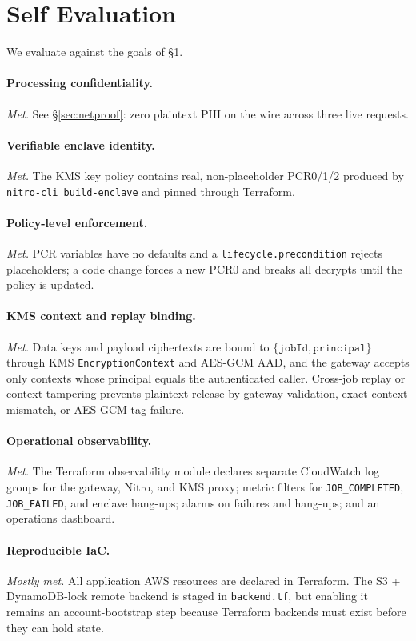 \documentclass[11pt]{article}
\begin{document}
\section{Self Evaluation}

We evaluate against the goals of \S1.

\paragraph{Processing confidentiality.} \emph{Met.} See
\S\ref{sec:netproof}: zero plaintext PHI on the wire across three
live requests.

\paragraph{Verifiable enclave identity.} \emph{Met.} The KMS key
policy contains real, non-placeholder PCR0/1/2 produced by
\texttt{nitro-cli build-enclave} and pinned through Terraform.

\paragraph{Policy-level enforcement.} \emph{Met.} PCR variables have
no defaults and a \texttt{lifecycle.precondition} rejects
placeholders; a code change forces a new PCR0 and breaks all
decrypts until the policy is updated.

\paragraph{KMS context and replay binding.} \emph{Met.} Data keys and
payload ciphertexts are bound to $\{\texttt{jobId},
\texttt{principal}\}$ through KMS \texttt{EncryptionContext} and
AES-GCM AAD, and the gateway accepts only contexts whose principal
equals the authenticated caller. Cross-job replay or context tampering
prevents plaintext release by gateway validation, exact-context
mismatch, or AES-GCM tag failure.

\paragraph{Operational observability.} \emph{Met.} The Terraform
observability module declares separate CloudWatch log groups for the
gateway, Nitro, and KMS proxy; metric filters for
\texttt{JOB\_COMPLETED}, \texttt{JOB\_FAILED}, and enclave hang-ups;
alarms on failures and hang-ups; and an operations dashboard.

\paragraph{Reproducible IaC.} \emph{Mostly met.} All application AWS
resources are declared in Terraform. The S3 + DynamoDB-lock remote
backend is staged in \texttt{backend.tf}, but enabling it remains an
account-bootstrap step because Terraform backends must exist before
they can hold state.
\end{document}
